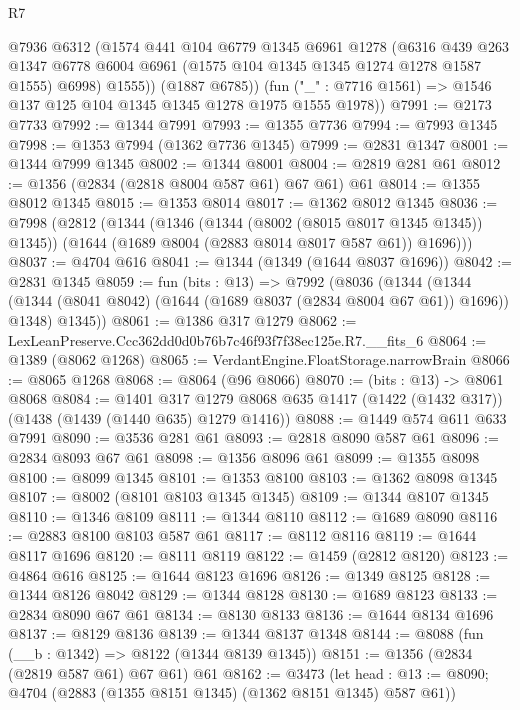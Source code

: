 \begin{lexlean}{R7}
\begin{coremodule}
          @7936
          @6312
          (@1574
            @441
            @104
            @6779
            @1345
            @6961
            @1278
            (@6316
              @439
              @263
              @1347
              @6778
              @6004
              @6961
              (@1575 @104 @1345 @1345 @1274 @1278 @1587 @1555)
              @6998)
            @1555))
        (@1887 @6785))
      (fun ("_" : @7716 @1561) => @1546 @137 @125 @104 @1345 @1345 @1278 @1975 @1555 @1978))
@7991 := @2173 @7733
@7992 := @1344 @7991
@7993 := @1355 @7736
@7994 := @7993 @1345
@7998 := @1353 @7994 (@1362 @7736 @1345)
@7999 := @2831 @1347
@8001 := @1344 @7999 @1345
@8002 := @1344 @8001
@8004 := @2819 @281 @61
@8012 := @1356 (@2834 (@2818 @8004 @587 @61) @67 @61) @61
@8014 := @1355 @8012 @1345
@8015 := @1353 @8014
@8017 := @1362 @8012 @1345
@8036 := @7998
    (@2812
      (@1344
        (@1346 (@1344 (@8002 (@8015 @8017 @1345 @1345)) @1345))
        (@1644 (@1689 @8004 (@2883 @8014 @8017 @587 @61)) @1696)))
@8037 := @4704 @616
@8041 := @1344 (@1349 (@1644 @8037 @1696))
@8042 := @2831 @1345
@8059 := fun (bits : @13) =>
  @7992
    (@8036
      (@1344
        (@1344 (@1344 (@8041 @8042) (@1644 (@1689 @8037 (@2834 @8004 @67 @61)) @1696)) @1348)
        @1345))
@8061 := @1386 @317 @1279
@8062 := LexLeanPreserve.Ccc362dd0d0b76b7c46f93f7f38ec125e.R7.__fits_6
@8064 := @1389 (@8062 @1268)
@8065 := VerdantEngine.FloatStorage.narrowBrain
@8066 := @8065 @1268
@8068 := @8064 (@96 @8066)
@8070 := (bits : @13) -> @8061 @8068
@8084 := @1401
    @317
    @1279
    @8068
    @635
    @1417
    (@1422 (@1432 @317))
    (@1438 (@1439 (@1440 @635) @1279 @1416))
@8088 := @1449 @574 @611 @633 @7991
@8090 := @3536 @281 @61
@8093 := @2818 @8090 @587 @61
@8096 := @2834 @8093 @67 @61
@8098 := @1356 @8096 @61
@8099 := @1355 @8098
@8100 := @8099 @1345
@8101 := @1353 @8100
@8103 := @1362 @8098 @1345
@8107 := @8002 (@8101 @8103 @1345 @1345)
@8109 := @1344 @8107 @1345
@8110 := @1346 @8109
@8111 := @1344 @8110
@8112 := @1689 @8090
@8116 := @2883 @8100 @8103 @587 @61
@8117 := @8112 @8116
@8119 := @1644 @8117 @1696
@8120 := @8111 @8119
@8122 := @1459 (@2812 @8120)
@8123 := @4864 @616
@8125 := @1644 @8123 @1696
@8126 := @1349 @8125
@8128 := @1344 @8126 @8042
@8129 := @1344 @8128
@8130 := @1689 @8123
@8133 := @2834 @8090 @67 @61
@8134 := @8130 @8133
@8136 := @1644 @8134 @1696
@8137 := @8129 @8136
@8139 := @1344 @8137 @1348
@8144 := @8088 (fun (__b : @1342) => @8122 (@1344 @8139 @1345))
@8151 := @1356 (@2834 (@2819 @587 @61) @67 @61) @61
@8162 := @3473
    (let head : @13 := @8090; @4704 (@2883 (@1355 @8151 @1345) (@1362 @8151 @1345) @587 @61))

\end{coremodule}
\end{lexlean}
